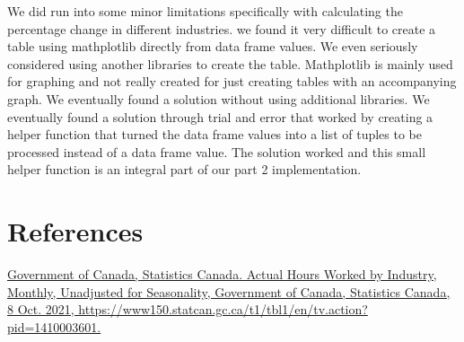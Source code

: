 \documentclass[fontsize=11pt]{article}
\begin{document}
\medskip


We did run into some minor limitations specifically with calculating the percentage change in different industries. we found it very difficult to create a table using mathplotlib directly from data frame values. We even seriously considered using another libraries  to create the table. Mathplotlib is mainly used for graphing and not really created for just creating tables with an accompanying graph. We eventually found a solution without using additional libraries. We eventually found a solution through trial and error that worked by creating a helper function that turned the data frame values into a list of tuples to be processed instead of a data frame value. The solution worked and this small helper function is an integral part of our part 2 implementation.



\section{References}
 
\href{ https://www150.statcan.gc.ca/t1/tbl1/en/tv.action?pid=1410003601 }{ Government of Canada, Statistics Canada. Actual Hours Worked by Industry, Monthly, Unadjusted for Seasonality, Government of Canada, Statistics Canada, 8 Oct. 2021, https://www150.statcan.gc.ca/t1/tbl1/en/tv.action?pid=1410003601. } 

  
  
  
\end{document}
